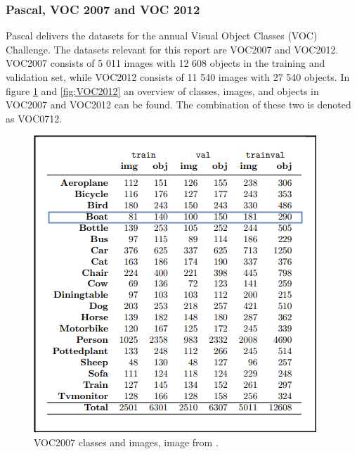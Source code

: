 \subsubsection{Pascal, VOC 2007 and VOC 2012}
Pascal delivers the datasets for the annual Visual Object Classes (VOC) Challenge. The datasets relevant for this report are VOC2007 and VOC2012. VOC2007 consists of 5 011 images with 12 608 objects in the training and validation set, while VOC2012 consists of  11 540 images with 27 540 objects. In figure \ref{fig:VOC2007} and \ref{fig:VOC2012} an overview of classes, images, and objects in VOC2007 and VOC2012 can be found. The combination of these two is denoted as VOC0712.


\begin{figure}[h!]
    \centering
    \includegraphics[scale=0.4]{fig/VOC2007.png}
    \caption{VOC2007 classes and images, image from \citep{Everingham2007}.}
    \label{fig:VOC2007}
\end{figure}

